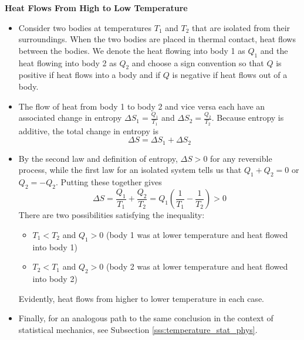 \documentclass[11pt, a4paper]{article}
\begin{document}
\textbf{Heat Flows From High to Low Temperature}
\begin{itemize}
	\item Consider two bodies at temperatures $ T_{1} $ and $ T_{2} $ that are isolated from their surroundings. When the two bodies are placed in thermal contact, heat flows between the bodies. We denote the heat flowing into body 1 as $ Q_{1} $ and the heat flowing into body 2 as $ Q_{2} $ and choose a sign convention so that $ Q $ is positive if heat flows into a body and if $ Q $ is negative if heat flows out of a body. 
	
	\item The flow of heat from body 1 to body 2 and vice versa each have an associated change in entropy $ \Delta S_{1} = \frac{Q_{1}}{T_{1}} $ and $ \Delta S_{2} = \frac{Q_{2}}{T_{2}} $. Because entropy is additive, the total change in entropy is
	\begin{equation*}
		\Delta S = \Delta S_{1} + \Delta S_{2}
	\end{equation*}
	
	\item By the second law and definition of entropy, $ \Delta S > 0 $ for any reversible process, while the first law for an isolated system tells us that $ Q_{1} + Q_{2} = 0 $ or $ Q_{2} = - Q_{2} $. Putting these together gives
	\begin{equation*}
		\Delta S = \frac{Q_{1}}{T_{1}}  + \frac{Q_{2}}{T_{2}} = Q_{1} \left(\frac{1}{T_{1}} - \frac{1}{T_{2}}\right) > 0
	\end{equation*}
	There are two possibilities satisfying the inequality:
	\begin{itemize}
		\item $ T_{1} < T_{2} $ and $ Q_{1} > 0 $ (body 1 was at lower temperature and heat flowed into body 1)
		\item $ T_{2} < T_{1} $ and $ Q_{2} > 0 $ (body 2 was at lower temperature and heat flowed into body 2)
	\end{itemize}
	Evidently, heat flows from higher to lower temperature in each case. 
	
	\item Finally, for an analogous path to the same conclusion in the context of statistical mechanics, see Subsection \ref{sss:temperature_stat_phys}.
\end{itemize}
\end{document}
